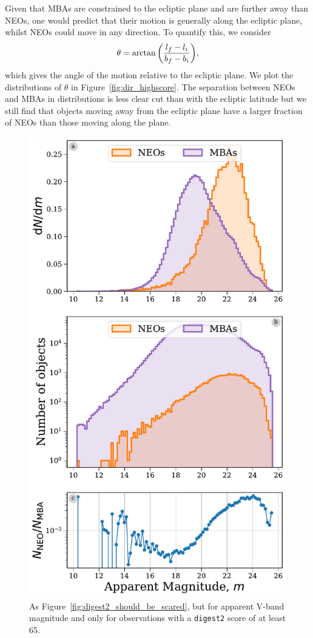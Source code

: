 \documentclass[preprint2, twocolappendix]{aastex631}
\newcommand{\dig}{\texttt{digest2}}
\begin{document}
Given that MBAs are constrained to the ecliptic plane and are further away than NEOs, one would predict that their motion is generally along the ecliptic plane, whilst NEOs could move in any direction. To quantify this, we consider
\begin{equation}
    \theta = \arctan \qty( \frac{l_f - l_i}{b_f - b_i} ),
\end{equation}
which gives the angle of the motion relative to the ecliptic plane. We plot the distributions of $\theta$ in Figure~\ref{fig:dir_highscore}. The separation between NEOs and MBAs in distributions is less clear cut than with the ecliptic latitude but we still find that objects moving away from the ecliptic plane have a larger fraction of NEOs than those moving along the plane.

\begin{figure}[htb]
    \centering
    \includegraphics[width=\columnwidth]{figures/apparent_mag_dist_highscore.pdf}
    \caption{As Figure~\ref{fig:digest2_should_be_scared}, but for apparent V-band magnitude and only for observations with a \dig{} score of at least 65.}
    \label{fig:app_mag_highscore}
\end{figure}
\end{document}
